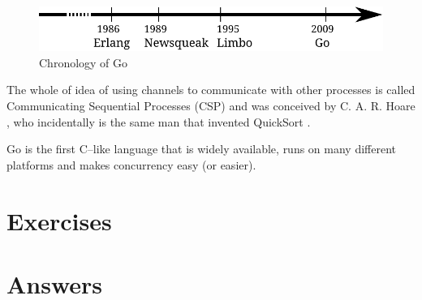\begin{figure}[H]
\caption{Chronology of Go}
\label{fig:chrono-of-go}
\begin{center}
\includegraphics[scale=0.65]{fig/go-history.pdf}
\end{center}
\end{figure}

The whole of idea of using channels to communicate with other processes
is called Communicating Sequential Processes (CSP) and was conceived
by C. A. R. Hoare \cite{hoare}, who incidentally is the same man that
invented QuickSort \cite{quicksort}.

\begin{lbar}[]
Go is the first C--like language that is widely available,
runs on many
different platforms and makes concurrency easy (or easier).
\end{lbar}

\section{Exercises}


\cleardoublepage
\section{Answers}
\shipoutAnswer
